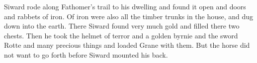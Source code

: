 \bpb Siward rode along Fathomer’s trail to his dwelling and found it open and doors and rabbets of iron. Of iron were also all the timber trunks in the house, and dug down into the earth. There Siward found very much gold and filled there two chests. Then he took the helmet of terror and a golden byrnie and the sword Rotte and many precious things and loaded Grane with them. But the horse did not want to go forth before Siward mounted his back.\epb\epg

\sectionline
